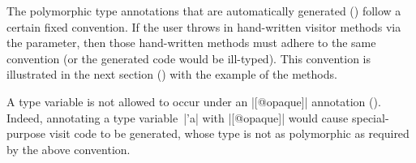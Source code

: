 \documentclass[11pt,a4paper,twoside]{article}
\begin{document}

The polymorphic type annotations that are automatically generated
() follow a certain fixed convention. If the
user throws in hand-written visitor methods via the \ancestors parameter, then
those hand-written methods must adhere to the same convention (or the
generated code would be ill-typed). This convention is illustrated in the next
section () with the example of the
 methods.

A type variable is not allowed to occur under an \oc|[@opaque]| annotation
(). Indeed, annotating a type variable~\oc|'a| with
\oc|[@opaque]| would cause special-purpose visit code to be generated, whose
type is not as polymorphic as required by the above convention.





\begin{comment}

\subsubsection{Mixing the monomorphic and polymorphic modes}
\label{sec:intro:parameterized:fine}

It is possible to mix the monomorphic and polymorphic modes
(\sref{sec:intro:parameterized:mono}, \sref{sec:intro:parameterized:poly}) in
a single generated visitor class. Suppose we wish to generate a visitor class
for the type \oc|('a, 'b) dictionary|. Suppose, for some reason, that we would
like \tyconvisitor{'a} to be a virtual visitor method and \tyconvisitor{'b} to
be a visitor function, which is passed as an argument to
\tyconvisitor{dictionary}. This can be achieved by declaring
%
\oc|polymorphic = ["'b"]| as part of the \derivingvisitors annotation.


\end{comment}
\end{document}
